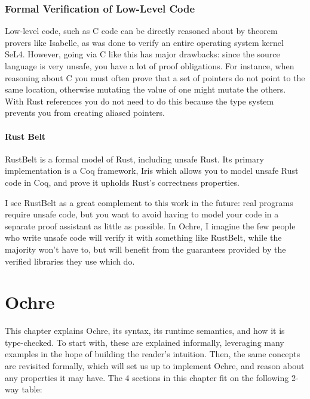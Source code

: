 \documentclass[12pt,twoside]{report}
\begin{document}
\subsection{Formal Verification of Low-Level Code}
Low-level code, such as C code can be directly reasoned about by theorem provers like Isabelle, as was done to verify an entire operating system kernel SeL4\citep{klein_sel4_2009}. However, going via C like this has major drawbacks: since the source language is very unsafe, you have a lot of proof obligations. For instance, when reasoning about C you must often prove that a set of pointers do not point to the same location, otherwise mutating the value of one might mutate the others. With Rust references you do not need to do this because the type system prevents you from creating aliased pointers.

\subsubsection{Rust Belt}
RustBelt\citep{jung_rustbelt_2018} is a formal model of Rust, including unsafe Rust. Its primary implementation is a Coq framework, Iris\citep{noauthor_iris_nodate} which allows you to model unsafe Rust code in Coq, and prove it upholds Rust's correctness properties.

I see RustBelt as a great complement to this work in the future: real programs require unsafe code, but you want to avoid having to model your code in a separate proof assistant as little as possible. In Ochre, I imagine the few people who write unsafe code will verify it with something like RustBelt, while the majority won't have to, but will benefit from the guarantees provided by the verified libraries they use which do.

\chapter{Ochre}
\label{section:ochre}
This chapter explains Ochre, its syntax, its runtime semantics, and how it is type-checked. To start with, these are explained informally, leveraging many examples in the hope of building the reader's intuition. Then, the same concepts are revisited formally, which will set us up to implement Ochre, and reason about any properties it may have. The 4 sections in this chapter fit on the following 2-way table:

\end{document}
